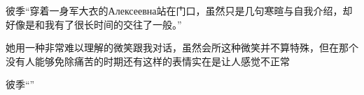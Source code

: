 \documentclass{article}
\begin{document}
彼季“穿着一身军大衣的Алексеевна站在门口，虽然只是几句寒暄与自我介绍，却好像是和我有了很长时间的交往了一般。”

她用一种非常难以理解的微笑跟我对话，虽然会所这种微笑并不算特殊，但在那个没有人能够免除痛苦的时期还有这样的表情实在是让人感觉不正常

彼季“”




























\end{document}
